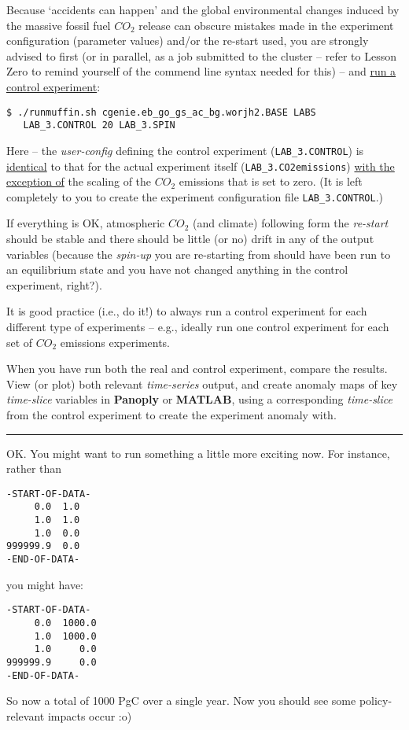 \documentclass[11pt,fleqn]{book} %
\begin{document}
\noindent Because ‘accidents can happen’ and the global environmental changes induced by the massive fossil fuel \(CO_{2}\) release can obscure mistakes made in the experiment configuration (parameter values) and/or the re-start used, you are strongly advised to first (or in parallel, as a job submitted to the cluster – refer to Lesson Zero to remind yourself of the commend line syntax needed for this) --  and \uline{run a control experiment}:
\vspace{-2pt}\begin{verbatim}
$ ./runmuffin.sh cgenie.eb_go_gs_ac_bg.worjh2.BASE LABS
   LAB_3.CONTROL 20 LAB_3.SPIN
\end{verbatim}\vspace{-2pt}
Here – the \textit{user-config} defining the control experiment (\texttt{LAB\_3.CONTROL}) is \uline{identical} to that for the actual experiment itself (\texttt{LAB\_3.CO2emissions}) \uline{with the exception of} the scaling of the \(CO_{2}\) emissions that is set to zero. (It is left completely to you to create the experiment configuration file \texttt{LAB\_3.CONTROL}.)

If everything is OK, atmospheric \(CO_{2}\) (and climate) following form the \textit{re-start} should be stable and there should be little (or no) drift in any of the output variables (because the \textit{spin-up} you are re-starting from should have been run to an equilibrium state and you have not changed anything in the control experiment, right?).

It is good practice (i.e., do it!) to always run a control experiment for each different type of experiments – e.g., ideally run one control experiment for each set of \(CO_{2}\) emissions experiments.

When you have run both the real and control experiment, compare the results. View (or plot) both relevant \textit{time-series} output, and create anomaly maps of key \textit{time-slice} variables in \textbf{Panoply} or \textbf{MATLAB}, using a corresponding \textit{time-slice} from the control experiment to create the experiment anomaly with.

\vspace{1mm}
\noindent\rule{4cm}{0.1mm}
\vspace{2mm}

\noindent OK. You might want to run something a little more exciting now. For instance, rather than
\vspace{-2pt}\begin{verbatim}
-START-OF-DATA-
     0.0  1.0
     1.0  1.0
     1.0  0.0
999999.9  0.0
-END-OF-DATA-
\end{verbatim}\vspace{-2pt}
you might have:
\vspace{-2pt}\begin{verbatim}
-START-OF-DATA-
     0.0  1000.0
     1.0  1000.0
     1.0     0.0
999999.9     0.0
-END-OF-DATA-
\end{verbatim}\vspace{-2pt}
So now a total of 1000 PgC over a single year. Now you should see some policy-relevant impacts occur :o)
\end{document}
